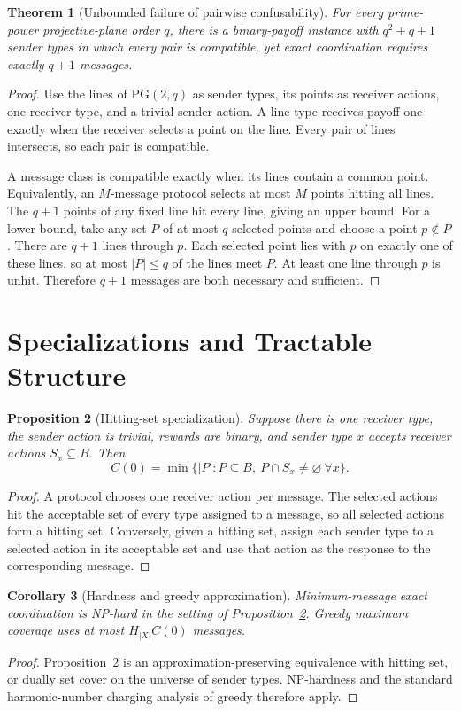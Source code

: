 \documentclass[letterpaper,10pt]{article}
\newtheorem{theorem}{Theorem}
\newtheorem{proposition}[theorem]{Proposition}
\newtheorem{corollary}[theorem]{Corollary}
\begin{document}
\begin{theorem}[Unbounded failure of pairwise confusability]\label{thm:pg}
For every prime-power projective-plane order $q$, there is a binary-payoff
instance with $q^2+q+1$ sender types in which every pair is compatible, yet
exact coordination requires exactly $q+1$ messages.
\end{theorem}
\begin{proof}
Use the lines of $\mathrm{PG}(2,q)$ as sender types, its points as receiver
actions, one receiver type, and a trivial sender action. A line type receives
payoff one exactly when the receiver selects a point on the line. Every pair of
lines intersects, so each pair is compatible.

A message class is compatible exactly when its lines contain a common point.
Equivalently, an $M$-message protocol selects at most $M$ points hitting all
lines. The $q+1$ points of any fixed line hit every line, giving an upper bound.
For a lower bound, take any set $P$ of at most $q$ selected points and choose a
point $p\notin P$. There are $q+1$ lines through $p$. Each selected point lies
with $p$ on exactly one of these lines, so at most $|P|\le q$ of the lines meet
$P$. At least one line through $p$ is unhit. Therefore $q+1$ messages are both
necessary and sufficient.
\end{proof}

\section{Specializations and Tractable Structure}

\begin{proposition}[Hitting-set specialization]\label{prop:hitting}
Suppose there is one receiver type, the sender action is trivial, rewards are
binary, and sender type $x$ accepts receiver actions $S_x\subseteq B$. Then
\[
C(0)=\min\{|P|:P\subseteq B,\ P\cap S_x\ne\varnothing\ \forall x\}.
\]
\end{proposition}
\begin{proof}
A protocol chooses one receiver action per message. The selected actions hit
the acceptable set of every type assigned to a message, so all selected
actions form a hitting set. Conversely, given a hitting set, assign each sender
type to a selected action in its acceptable set and use that action as the
response to the corresponding message.
\end{proof}

\begin{corollary}[Hardness and greedy approximation]
Minimum-message exact coordination is NP-hard in the setting of
Proposition~\ref{prop:hitting}. Greedy maximum coverage uses at most
$H_{|X|}C(0)$ messages.
\end{corollary}
\begin{proof}
Proposition~\ref{prop:hitting} is an approximation-preserving equivalence with
hitting set, or dually set cover on the universe of sender types. NP-hardness
and the standard harmonic-number charging analysis of greedy therefore apply.
\end{proof}
\end{document}
